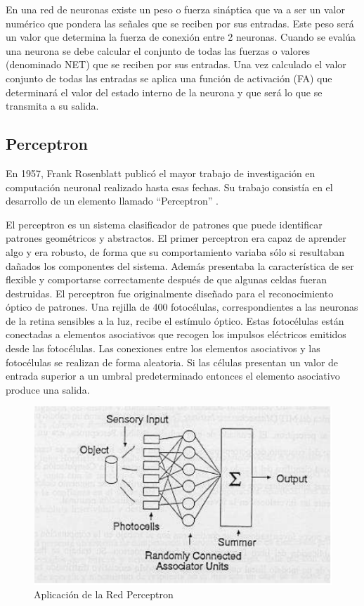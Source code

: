 En una red de neuronas existe un peso o fuerza sináptica que va a ser un valor numérico que pondera las señales que se reciben por sus entradas. Este peso será un valor que determina la fuerza de conexión entre 2 neuronas. Cuando se evalúa una neurona se debe calcular el conjunto de todas las fuerzas o valores (denominado NET) que se reciben por sus entradas. Una vez calculado el valor conjunto de todas las entradas se aplica una función de activación (FA) que determinará el valor del estado interno de la neurona y que será lo que se transmita a su salida\cite{pose2009introduccion}.

\subsection{Perceptron}
En 1957, Frank Rosenblatt publicó el mayor trabajo de investigación en computación neuronal realizado hasta esas fechas. Su trabajo consistía en el desarrollo de un
elemento llamado “Perceptron” \cite{olabe1998redes}.

\vspace{1\baselineskip}
El perceptron es un sistema clasificador de patrones que puede identificar patrones geométricos y abstractos. El primer perceptron era capaz de aprender algo y era robusto, de forma que su comportamiento variaba sólo si resultaban dañados los componentes del sistema. 
Además presentaba la característica de ser flexible y comportarse correctamente después de que algunas celdas fueran destruidas.
El perceptron fue originalmente diseñado para el reconocimiento óptico de patrones.
Una rejilla de 400 fotocélulas, correspondientes a las neuronas de la retina sensibles a la luz, recibe el estímulo óptico. Estas fotocélulas están conectadas a elementos asociativos que recogen los impulsos eléctricos emitidos desde las fotocélulas. Las
conexiones entre los elementos asociativos y las fotocélulas se realizan de forma aleatoria.
Si las células presentan un valor de entrada superior a un umbral predeterminado entonces el elemento asociativo produce una salida\cite{olabe1998redes}.

\begin{figure}[H]
  \begin{center}
    \includegraphics[scale=0.90]{./perceptron.png}
    \caption{Aplicación de la Red Perceptron}
    \label{fig:perceptron}
  \end{center}
\end{figure}

